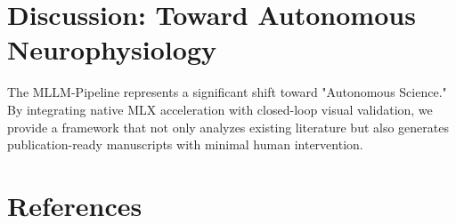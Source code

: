 \documentclass[twocolumn, 10pt]{article}
\begin{document}
\lipsum[13-20] %

\section{Discussion: Toward Autonomous Neurophysiology}
The MLLM-Pipeline represents a significant shift toward "Autonomous Science." By integrating native MLX acceleration with closed-loop visual validation, we provide a framework that not only analyzes existing literature but also generates publication-ready manuscripts with minimal human intervention. 

\lipsum[21-25] %

\section{References}


\end{document}
